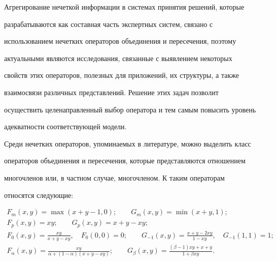 \maketitle










Агрегирование нечеткой информации в системах принятия решений, которые


разрабатываются как составная часть экспертных систем, связано с


использованием нечетких операторов объединения и пересечения, поэтому


актуальными являются исследования, связанные с выявлением некоторых


свойств этих операторов, полезных для приложений, их структуры, а также


взаимосвязи различных представлений. Решение этих задач позволит


осуществить целенаправленный выбор оператора и тем самым повысить уровень


адекватности соответствующей модели.





Среди нечетких операторов, упоминаемых в литературе, можно выделить класс


операторов объединения и пересечения, которые представляются отношением


многочленов или, в частном случае, многочленом. К таким операторам


относятся следующие:


\begin{gather*}


F_m(x,y)=\max(x+y-1,0);\qquad G_m(x,y)=\min(x+y,1);\\


F_p(x,y)=xy;\qquad G_p(x,y)=x+y-xy;\\


F_0(x,y)=\frac{xy}{x+y-xy},\quad F_0(0,0)=0;\qquad


G_{-1}(x,y)=\frac{x+y-2xy}{1-xy},\quad G_{-1}(1,1)=1;\\


F_\alpha(x,y)=\frac{xy}{\alpha+(1-\alpha)(x+y-xy)};\qquad


G_\beta(x,y)=\frac{(\beta-1)xy+x+y}{1+\beta xy}.


\end{gather*}


